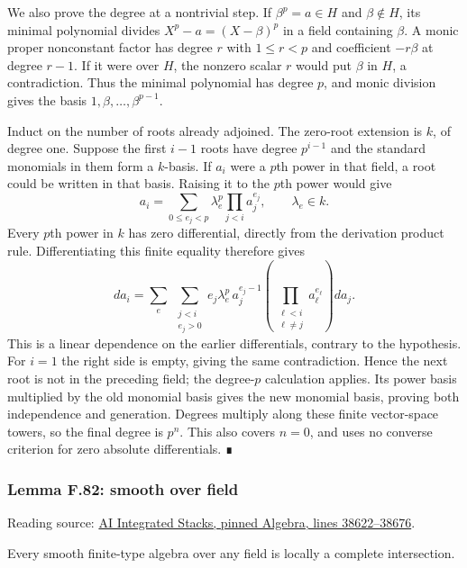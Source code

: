 \documentclass[11pt,a4paper,openany]{report}
\begin{document}
We also prove the degree at a nontrivial step. If \(\beta^p=a\in H\) and \(\beta\notin H\), its minimal polynomial divides \(X^p-a=(X-\beta)^p\) in a field containing \(\beta\). A monic proper nonconstant factor has degree \(r\) with \(1\leq r<p\) and coefficient \(-r\beta\) at degree \(r-1\). If it were over \(H\), the nonzero scalar \(r\) would put \(\beta\) in \(H\), a contradiction. Thus the minimal polynomial has degree \(p\), and monic division gives the basis \(1,\beta,\ldots,\beta^{p-1}\).

Induct on the number of roots already adjoined. The zero-root extension is \(k\), of degree one. Suppose the first \(i-1\) roots have degree \(p^{i-1}\) and the standard monomials in them form a \(k\)-basis. If \(a_i\) were a \(p\)th power in that field, a root could be written in that basis. Raising it to the \(p\)th power would give \[a_i=\sum_{0\leq e_j<p}\lambda_e^p\prod_{j<i}a_j^{e_j},
\qquad \lambda_e\in k.\] Every \(p\)th power in \(k\) has zero differential, directly from the derivation product rule. Differentiating this finite equality therefore gives \[
da_i=\sum_e\ \sum_{\substack{j<i\\e_j>0}}
e_j\lambda_e^p\,a_j^{e_j-1}
\left(\prod_{\substack{\ell<i\\\ell\ne j}}a_\ell^{e_\ell}\right)da_j.
\] This is a linear dependence on the earlier differentials, contrary to the hypothesis. For \(i=1\) the right side is empty, giving the same contradiction. Hence the next root is not in the preceding field; the degree-\(p\) calculation applies. Its power basis multiplied by the old monomial basis gives the new monomial basis, proving both independence and generation. Degrees multiply along these finite vector-space towers, so the final degree is \(p^n\). This also covers \(n=0\), and uses no converse criterion for zero absolute differentials. ∎

\label{AG-RG-S05-algebra-lemma-smooth-over-field}

\subsubsection{Lemma F.82: smooth over field}\label{AG-RG-S05-lemma-f.82-smooth-over-field}

Reading source: \href{https://github.com/KokunoYumeto/unofficial-stacks-project-ai-drafts/blob/565b10e987aba5969b21145a0833f42d69f96790/algebra.tex\#L38622-L38676}{AI Integrated Stacks, pinned Algebra, lines 38622--38676}.

Every smooth finite-type algebra over any field is locally a complete intersection.
\end{document}
